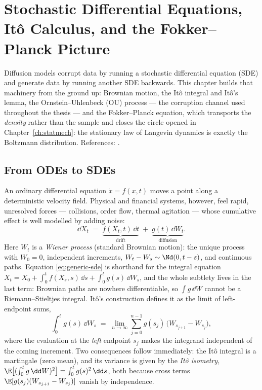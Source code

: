 \chapter{Stochastic Differential Equations, It\^o Calculus, and the
Fokker--Planck Picture}\label{ch:sde}

Diffusion models corrupt data by running a stochastic differential equation
(SDE) and generate data by running another SDE backwards. This chapter builds
that machinery from the ground up: Brownian motion, the It\^o integral and
It\^o's lemma, the Ornstein--Uhlenbeck (OU) process --- the corruption
channel used throughout the thesis --- and the Fokker--Planck equation, which
transports the \emph{density} rather than the sample and closes the circle
opened in Chapter~\ref{ch:statmech}: the stationary law of Langevin dynamics
is exactly the Boltzmann distribution. References:
\citet{oksendal2003stochastic, gardiner2009stochastic, risken1996fokker}.

\section{From ODEs to SDEs}\label{sec:ode-to-sde}

An ordinary differential equation $\dot x = f(x, t)$ moves a point along a
deterministic velocity field. Physical and financial systems, however, feel
rapid, unresolved forces --- collisions, order flow, thermal agitation ---
whose cumulative effect is well modelled by adding noise:
\begin{equation}
  \dd X_t \;=\; \underbrace{f(X_t, t)\,\dd t}_{\text{drift}}
  \;+\; \underbrace{g(t)\,\dd W_t}_{\text{diffusion}} .
  \label{eq:generic-sde}
\end{equation}
Here $W_t$ is a \emph{Wiener process} (standard Brownian motion): the unique
process with $W_0 = 0$, independent increments,
$W_t - W_s \sim \Nd(0, t-s)$, and continuous paths. Equation
\eqref{eq:generic-sde} is shorthand for the integral equation
$X_t = X_0 + \int_0^t f(X_s, s)\,\dd s + \int_0^t g(s)\,\dd W_s$, and the
whole subtlety lives in the last term: Brownian paths are nowhere
differentiable, so $\int g\,\dd W$ cannot be a Riemann--Stieltjes integral.
It\^o's construction \citep{ito1944stochastic} defines it as the limit of
left-endpoint sums,
\begin{equation}
  \int_0^t g(s)\, \dd W_s
  \;=\; \lim_{n \to \infty} \sum_{j=0}^{n-1}
        g(s_j)\,\big( W_{s_{j+1}} - W_{s_j} \big),
  \label{eq:ito-integral}
\end{equation}
where the evaluation at the \emph{left} endpoint $s_j$ makes the integrand
independent of the coming increment. Two consequences follow immediately:
the It\^o integral is a martingale (zero mean), and its variance is given by
the \emph{It\^o isometry},
$\E\big[ (\int_0^t g\,\dd W)^2 \big] = \int_0^t g(s)^2\,\dd s$, both because
cross terms $\E[g(s_j)(W_{s_{j+1}}-W_{s_j})] $ vanish by independence.

